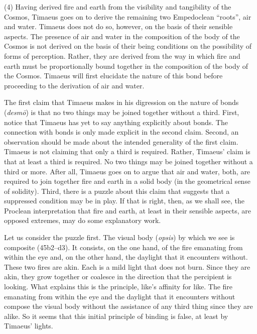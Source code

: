 (4) Having derived fire and earth from the visibility and tangibility of the Cosmos, Timaeus goes on to derive the remaining two Empedoclean ``roots'', air and water. Timae\-us does not do so, however, on the basis of their sensible aspects. The presence of air and water in the composition of the body of the Cosmos is not derived on the basis of their being conditions on the possibility of forms of perception. Rather, they are derived from the way in which fire and earth must be proportionally bound together in the composition of the body of the Cosmos. Timaeus will first elucidate the nature of this bond before proceeding to the derivation of air and water.

The first claim that Timaeus makes in his digression on the nature of bonds (\emph{desmō}) is that no two things may be joined together without a third. First, notice that Timaeus has yet to say anything explicitly about bonds. The connection with bonds is only made explicit in the second claim. Second, an observation should be made about the intended generality of the first claim. Timaeus is not claiming that only a third is required. Rather, Timaeus' claim is that at least a third is required. No two things may be joined together without a third or more. After all, Timaeus goes on to argue that air and water, both, are required to join together fire and earth in a solid body (in the geometrical sense of solidity). Third, there is a puzzle about this claim that suggests that a suppressed condition may be in play. If that is right, then, as we shall see, the Proclean interpretation that fire and earth, at least in their sensible aspects, are opposed extremes, may do some explanatory work.

Let us consider the puzzle first. The visual body (\emph{opsis}) by which we see is composite (45b2--d3). It consists, on the one hand, of the fire emanating from within the eye and, on the other hand, the daylight that it encounters without. These two fires are akin. Each is a mild light that does not burn. Since they are akin, they grow together or coalesce in the direction that the percipient is looking. What explains this is the principle, like's affinity for like. The fire emanating from within the eye and the daylight that it encounters without compose the visual body without the assistance of any third thing since they are alike. So it seems that this initial principle of binding is false, at least by Timaeus' lights.

